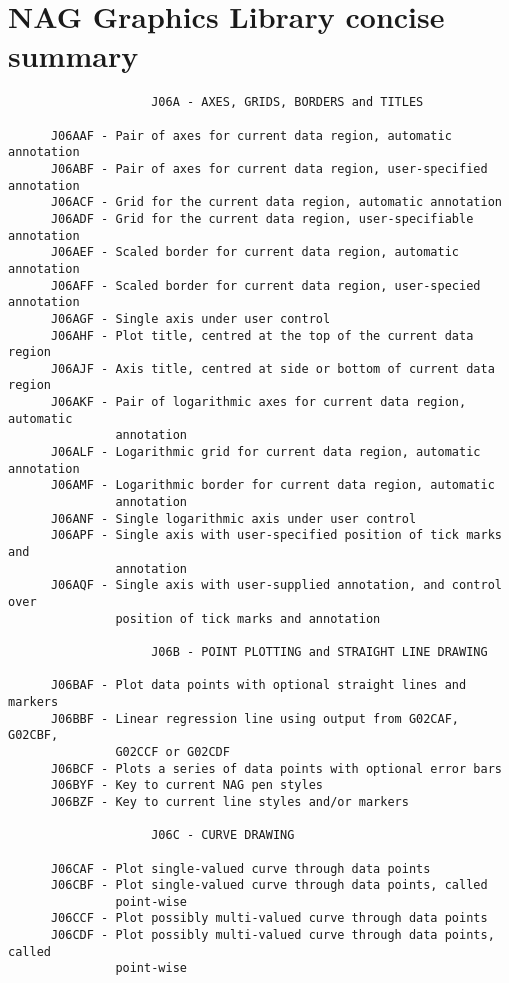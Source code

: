 \chapter{NAG Graphics Library concise summary}
 
\begin{verbatim}
                    J06A - AXES, GRIDS, BORDERS and TITLES
 
      J06AAF - Pair of axes for current data region, automatic annotation
      J06ABF - Pair of axes for current data region, user-specified annotation
      J06ACF - Grid for the current data region, automatic annotation
      J06ADF - Grid for the current data region, user-specifiable annotation
      J06AEF - Scaled border for current data region, automatic annotation
      J06AFF - Scaled border for current data region, user-specied annotation
      J06AGF - Single axis under user control
      J06AHF - Plot title, centred at the top of the current data region
      J06AJF - Axis title, centred at side or bottom of current data region
      J06AKF - Pair of logarithmic axes for current data region, automatic
               annotation
      J06ALF - Logarithmic grid for current data region, automatic annotation
      J06AMF - Logarithmic border for current data region, automatic
               annotation
      J06ANF - Single logarithmic axis under user control
      J06APF - Single axis with user-specified position of tick marks and
               annotation
      J06AQF - Single axis with user-supplied annotation, and control over
               position of tick marks and annotation
 
                    J06B - POINT PLOTTING and STRAIGHT LINE DRAWING
 
      J06BAF - Plot data points with optional straight lines and markers
      J06BBF - Linear regression line using output from G02CAF, G02CBF,
               G02CCF or G02CDF
      J06BCF - Plots a series of data points with optional error bars
      J06BYF - Key to current NAG pen styles
      J06BZF - Key to current line styles and/or markers
 
                    J06C - CURVE DRAWING
 
      J06CAF - Plot single-valued curve through data points
      J06CBF - Plot single-valued curve through data points, called
               point-wise
      J06CCF - Plot possibly multi-valued curve through data points
      J06CDF - Plot possibly multi-valued curve through data points, called
               point-wise
 

\end{verbatim}
